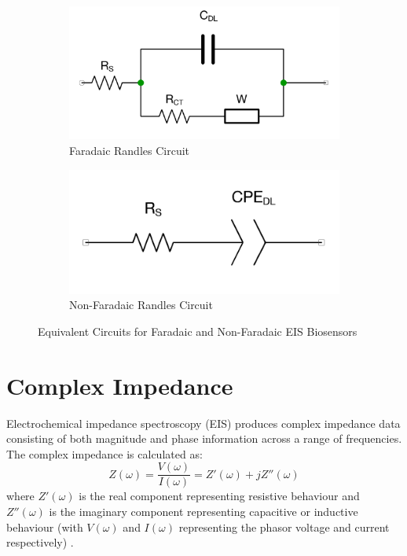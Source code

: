 \begin{figure}[ht]
    \centering
    \begin{subfigure}{0.45\textwidth}
        \centering
        \includegraphics[width=\textwidth]{RandlesFaradaic.png}
        \caption{Faradaic Randles Circuit}
        \label{fig:randles_fardaic}
    \end{subfigure}
    \hfill
    \begin{subfigure}{0.45\textwidth}
        \centering
        \includegraphics[width=\textwidth]{RandlesNonFaradaic.png}
        \caption{Non-Faradaic Randles Circuit}
        \label{fig:randles_non_faradaic}    
    \end{subfigure}
    \caption{Equivalent Circuits for Faradaic and Non-Faradaic EIS Biosensors}
    \label{fig:randles_circuits}
\end{figure}

\section{Complex Impedance}
Electrochemical impedance spectroscopy (EIS) produces complex impedance data consisting of both magnitude and phase information across a range of frequencies. The complex impedance is calculated as:
\begin{equation}
    Z(\omega) = \frac{V(\omega)}{I(\omega)} = Z'(\omega) + jZ''(\omega)
\end{equation}
where $Z'(\omega)$ is the real component representing resistive behaviour and $Z''(\omega)$ is the imaginary component representing capacitive or inductive behaviour (with $V(\omega)$ and $I(\omega)$ representing the phasor voltage and current respectively) \cite{lazanasErratumElectrochemicalImpedance2025}.

